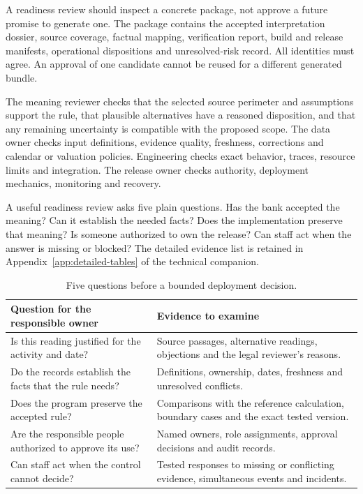 A readiness review should inspect a concrete package, not approve a future promise
to generate one. The package contains the accepted interpretation dossier, source
coverage, factual mapping, verification report, build and release manifests,
operational dispositions and unresolved-risk record. All identities must agree.
An approval of one candidate cannot be reused for a different generated bundle.

The meaning reviewer checks that the selected source perimeter and assumptions
support the rule, that plausible alternatives have a reasoned disposition, and
that any remaining uncertainty is compatible with the proposed scope. The data
owner checks input definitions, evidence quality, freshness, corrections and
calendar or valuation policies. Engineering checks exact behavior, traces,
resource limits and integration. The release owner checks authority, deployment
mechanics, monitoring and recovery.


A useful readiness review asks five plain questions. Has the bank accepted the
meaning? Can it establish the needed facts? Does the implementation preserve that
meaning? Is someone authorized to own the release? Can staff act when the answer
is missing or blocked? The detailed evidence list is retained in Appendix~\ref{app:detailed-tables} of the technical companion.

\begin{table}[H]
\centering
\caption{Five questions before a bounded deployment decision.}
\label{tab:readiness-summary}
\begin{tabularx}{\textwidth}{P{59mm}Y}
\toprule
Question for the responsible owner & Evidence to examine\\
\midrule
Is this reading justified for the activity and date? & Source passages, alternative readings, objections and the legal reviewer's reasons.\\
\addlinespace[0.5em]
Do the records establish the facts that the rule needs? & Definitions, ownership, dates, freshness and unresolved conflicts.\\
\addlinespace[0.5em]
Does the program preserve the accepted rule? & Comparisons with the reference calculation, boundary cases and the exact tested version.\\
\addlinespace[0.5em]
Are the responsible people authorized to approve its use? & Named owners, role assignments, approval decisions and audit records.\\
\addlinespace[0.5em]
Can staff act when the control cannot decide? & Tested responses to missing or conflicting evidence, simultaneous events and incidents.\\
\bottomrule
\end{tabularx}
\end{table}


